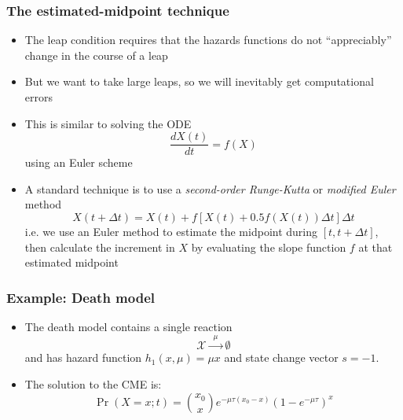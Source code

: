 \documentclass[t,compress]{beamer}
\begin{document}
\begin{frame}
\begin{figure}
%
\end{figure}
\end{frame}




\begin{frame}
\frametitle{The estimated-midpoint technique}

\begin{itemize}
\item The leap condition requires that the hazards functions do not
  ``appreciably'' change in the course of a leap
\item But we want to take large leaps, so we will inevitably get computational errors
\item This is similar to solving the ODE
\[
\frac{dX(t)}{dt} = f(X)
\] 
using an Euler scheme
\item A standard technique is to use a \textit{second-order Runge-Kutta} or \textit{modified Euler} method
\[
X(t + \Delta t) = X(t) + f[X(t) + 0.5 f(X(t)) \Delta t] \Delta t
\]
i.e. we use an Euler method to estimate the midpoint during $[t, t+\Delta t]$, then calculate the increment in $X$ by evaluating the slope function $f$ at that
estimated midpoint
\end{itemize}

\end{frame}



\begin{frame}
\frametitle{Example: Death model}

\begin{itemize}
\item The death model contains a single reaction
\[
\mathcal{X}\xrightarrow{\phantom{a}\mu \phantom{a}}  \emptyset
\]
and has hazard function $h_1(x, \mu) = \mu x$ and state change vector $s=-1$.
\item The solution to the CME is:
\[
\Pr(X=x; t) = \binom{x_0}{x} e^{-\mu \tau(x_0-x)} (1-e^{-\mu \tau })^x
\]
\end{itemize}
\end{frame}
\end{document}
